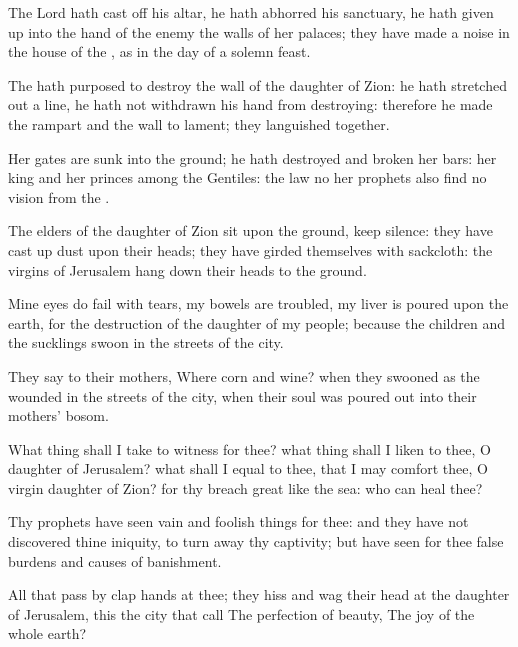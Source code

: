 {The
Lord hath cast
off his
altar, he hath
abhorred his
sanctuary, he hath given
up into the
hand of the
enemy the
walls of her
palaces; they have
made a
noise in the
house of the
{}, as in the
day of a solemn
feast.

The
{} hath
purposed to
destroy the
wall of the
daughter of
Zion: he hath stretched
out a
line, he hath not
withdrawn his
hand from
destroying: therefore he made the
rampart and the
wall to
lament; they
languished
together.

Her
gates are
sunk into the
ground; he hath
destroyed and
broken her
bars: her
king and her
princes
{} among the
Gentiles: the
law
{} no
{} her
prophets also
find no
vision from the
{}.


\par }{\PP {}The
elders of the
daughter of
Zion
sit upon the
ground,
{} keep
silence: they have cast
up
dust upon their
heads; they have
girded themselves with
sackcloth: the
virgins of
Jerusalem hang
down their
heads to the
ground.

Mine
eyes do
fail with
tears, my
bowels are
troubled, my
liver is
poured upon the
earth, for the
destruction of the
daughter of my
people; because the
children and the
sucklings
swoon in the
streets of the
city.

They
say to their
mothers, Where
{}
corn and
wine? when they
swooned as the
wounded in the
streets of the
city, when their
soul was poured
out into their
mothers’
bosom.

What thing shall I take to
witness for thee? what
thing shall I
liken to thee, O
daughter of
Jerusalem? what shall I
equal to thee, that I may
comfort thee, O
virgin
daughter of
Zion? for thy
breach
{}
great like the
sea: who can
heal thee?

Thy
prophets have
seen
vain and foolish
things for thee: and they have not
discovered thine
iniquity, to turn
away thy
captivity; but have
seen for thee
false
burdens and causes of
banishment.

All that
pass by
clap
{}
hands at
thee; they
hiss and
wag their
head at the
daughter of
Jerusalem,
{} this the
city that
{}
call The
perfection of
beauty, The
joy of the whole
earth?

}

